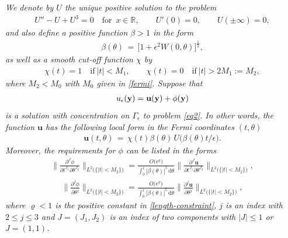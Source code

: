 \documentclass[10pt, reqno]{amsart}
\numberwithin{equation}{section}
\theoremstyle{definition}
\begin{document}
\smallskip
{\it
We denote by $U$ the unique positive solution to the problem
\begin{align}
U'' - U + U^3= 0 \quad \text{for }\, x\in {\mathbb R},
\qquad U'(0) =0, \qquad U(\pm \infty) =0,
\label{block}
\end{align}
and also define a positive function $\beta>1$ in the form
\begin{align}
\beta(\theta) \,=\, \big[1+ \epsilon^2 W(0, \theta) \big]^{\frac 12},
\label{beta}
\end{align}
as well as a smooth cut-off function $\chi$ by
\begin{align}
\chi(t)=1\quad\mbox{if}\ |t|<M_1,
\qquad
\chi(t)=0\quad\mbox{if}\ |t|>2M_1:=M_2,
\label{cut-off000000}
\end{align}
where $M_2<M_0$ with $M_0$ given in \eqref{fermi}.
Suppose that
\begin{align}
u_\epsilon({\bf y})={\mathbf u}({\bf y})+\phi({\bf y})
\label{u-decomposition}
\end{align}
is a solution with concentration on $\Gamma_{\epsilon}$ to problem \eqref{eq2}.
In other words, the function ${\mathbf u}$ has the following local form in the Fermi coordinates $(t, \theta)$
\begin{align}
{\mathbf u} (t, \theta)
\,=\,
\chi(t)\beta(\theta)\, U\big( \beta(\theta)t/\epsilon\big).
\label{mathbfu}
\end{align}
Moreover, the requirements for $\phi$ can be listed in the forms
\begin{align}
\Big\| \frac{\partial^J\phi}{\partial t^{J_1}\partial \theta^{J_2}}\Big\|_{L^2\big(\{ |t|< M_2\}\big)}
=
 \frac{O\big(\epsilon^\varrho\big)}{\displaystyle\int_0^{\ell}|\beta(\theta)|^5\,{\mathrm d}\theta}
\Big\| \frac{\partial^J{\mathbf u}}{\partial t^{J_1}\partial \theta^{J_2}}\Big\|_{L^2\big(\{ |t|< M_2\}\big)},
\label{smallperturbation0}
\end{align}
\begin{align}
\Big\|\frac{\partial^j\phi}{\partial \theta^j}\Big\|_{L^2\big(\{ |t|< M_2\}\big)}
=
 \frac{O\big(\epsilon^\varrho\big)}{\displaystyle\int_0^{\ell}|\beta(\theta)|^5\,{\mathrm d}\theta}
\Big\|\frac{\partial^j{\mathbf u}}{\partial \theta^j} \Big\|_{L^2\big(\{ |t|< M_2\}\big)},
\label{smallperturbation1}
\end{align}
where $\varrho<1$ is the positive constant in \eqref{length-constraint}, $j$ is an index with $2\leq j\leq 3$ and $J=(J_1, J_2)$ is an index of two components with $|J|\leq 1$ or $J=(1, 1)$.
}
\end{document}
